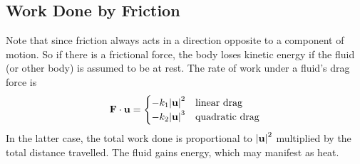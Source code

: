 \documentclass{article}
\begin{document}
\subsection{Work Done by Friction}
Note that since friction always acts in a direction opposite to a component of motion. So if there is a frictional force, the body loses kinetic energy if the fluid (or other body) is assumed to be at rest. The rate of work under a fluid's drag force is
\[ \vb F \cdot \vb u = \begin{cases}
		-k_1 \abs{\vb u}^2 & \text{linear drag}    \\
		-k_2 \abs{\vb u}^3 & \text{quadratic drag}
	\end{cases} \]
In the latter case, the total work done is proportional to $\abs{\vb u}^2$ multiplied by the total distance travelled. The fluid gains energy, which may manifest as heat.
\end{document}
